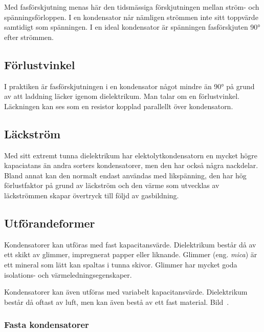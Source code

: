 Med fasförskjutning menas här den tidsmässiga förskjutningen mellan ström- och
spänningsförloppen.
I en kondensator når nämligen strömmen inte sitt toppvärde samtidigt som
spänningen.
I en ideal kondensator är spänningen fasförskjuten \ang{90} efter strömmen.

\subsection{Förlustvinkel}

I praktiken är fasförskjutningen i en kondensator något mindre än \ang{90} på
grund av att laddning läcker igenom dielektrikum.
Man talar om en förlustvinkel.
Läckningen kan ses som en resistor kopplad parallellt över kondensatorn.

\subsection{Läckström}

Med sitt extremt tunna dielektrikum har elektolytkondensatorn en mycket högre
kapaciatans än andra sorters kondensatorer, men den har också några nackdelar.
Bland annat kan den normalt endast användas med likspänning, den har hög 
förlustfaktor på grund av läckström och den värme som utvecklas av läckströmmen 
skapar övertryck till följd av gasbildning.

\subsection{Utförandeformer}

Kondensatorer kan utföras med fast kapacitansvärde.
Dielektrikum består då av ett skikt av glimmer, impregnerat papper eller liknande.
Glimmer (eng. \emph{mica}) är ett mineral som lätt kan spaltas i tunna skivor.
Glimmer har mycket goda isolations- och värmeledningsegenskaper.

Kondensatorer kan även utföras med variabelt kapacitansvärde.
Dielektrikum består då oftast av luft, men kan även bestå av ett fast material.
Bild~.

\subsubsection{Fasta kondensatorer}


